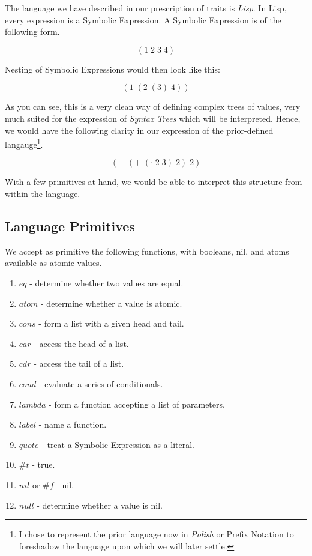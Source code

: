 \documentclass{article}
\begin{document}
The language we have described in our prescription of traits is \emph{Lisp}. In Lisp, every expression
is a Symbolic Expression. A Symbolic Expression is of the following form.

$$(1 \; 2 \; 3 \; 4)$$

Nesting of Symbolic Expressions would then look like this:

$$(1 \; (2 \; (3) \; 4))$$

As you can see, this is a very clean way of defining complex trees of values, very much suited for the
expression of \emph{Syntax Trees} which will be interpreted. Hence, we would have the following clarity
in our expression of the prior-defined langauge\footnote{I chose to represent the prior language now in
\emph{Polish} or Prefix Notation to foreshadow the language upon which we will later settle.}.

$$(- \; (+ \; (\cdot \; 2 \; 3) \; 2) \; 2)$$

With a few primitives at hand, we would be able to interpret this structure from within the language.

\subsection{Language Primitives}
We accept as primitive the following functions, with booleans, nil, and atoms available as atomic values.

\begin{enumerate}
  \item $eq$ - determine whether two values are equal.
  \item $atom$ - determine whether a value is atomic.
  \item $cons$ - form a list with a given head and tail.
  \item $car$ - access the head of a list.
  \item $cdr$ - access the tail of a list.
  \item $cond$ - evaluate a series of conditionals.
  \item $lambda$ - form a function accepting a list of parameters.
  \item $label$ - name a function.
  \item $quote$ - treat a Symbolic Expression as a literal.
  \item $\#t$ - true.
  \item $nil$ or $\#f$ - nil.
  \item $null$ - determine whether a value is nil.
\end{enumerate}
\end{document}
